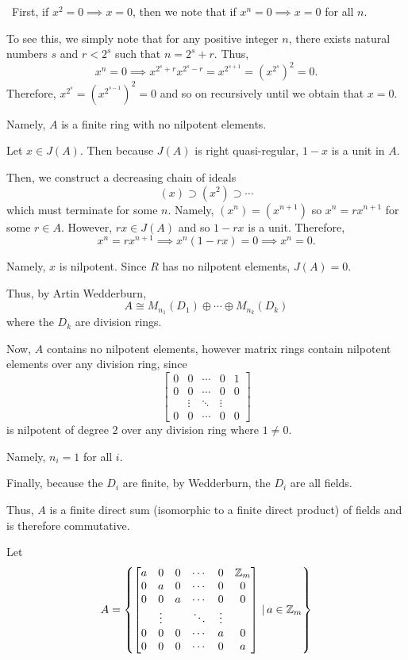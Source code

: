 \documentclass[12pt]{AlgebraQual}
\begin{document}
\begin{solution}$\,$
First, if $x^2=0\implies x=0$, then we note that if $x^n=0\implies x=0$ for all $n.$

To see this, we simply note that for any positive integer $n$, there exists natural numbers $s$ and $r<2^s$ such that $n=2^s+r$. Thus, $$x^n=0\implies x^{2^s+r}x^{2^s-r}=x^{2^{s+1}}=(x^{2^s})^2=0.$$ Therefore, $x^{2^s}=(x^{2^{s-1}})^2=0$ and so on recursively until we obtain that $x=0.$

Namely, $A$ is a finite ring with no nilpotent elements.

Let $x\in J(A)$. Then because $J(A)$ is right quasi-regular, $1-x$ is a unit in $A$.

Then, we construct a decreasing chain of ideals $$(x)\supset (x^2)\supset\cdots$$ which must terminate for some $n$. Namely, $(x^n)=(x^{n+1})$ so $x^n=rx^{n+1}$ for some $r\in A$. However, $rx\in J(A)$ and so $1-rx$ is a unit. Therefore, $$x^n=rx^{n+1}\implies x^n(1-rx)=0\implies x^n=0.$$

Namely, $x$ is nilpotent. Since $R$ has no nilpotent elements, $J(A)=0.$

Thus, by Artin Wedderburn, $$A\cong M_{n_1}(D_1)\oplus\cdots\oplus M_{n_k}(D_k)$$ where the $D_k$ are division rings.

Now, $A$ contains no nilpotent elements, however matrix rings contain nilpotent elements over any division ring, since $$\begin{bmatrix}
0 & 0 &\cdots & 0 & 1\\
0 & 0 &\cdots & 0 & 0\\
& \vdots &\ddots & \vdots &\\
0 & 0 &\cdots & 0 & 0
\end{bmatrix}$$ is nilpotent of degree $2$ over any division ring where $1\not=0$.

Namely, $n_i=1$ for all $i$.

Finally, because the $D_i$ are finite, by Wedderburn, the $D_i$ are all fields.

Thus, $A$ is a finite direct sum (isomorphic to a finite direct product) of fields and is therefore commutative.

Let $$A=\left\{\begin{bmatrix}
a & 0 & 0 & \cdots & 0 & \mathbb{Z}_m \\
0 & a  & 0 &\cdots & 0 & 0\\
0 & 0 & a  &\cdots & 0 & 0\\
& \vdots & &\ddots & \vdots & \\
0 & 0 & 0 & \cdots & a  & 0\\
0 & 0 & 0 &\cdots & 0 & a
\end{bmatrix}\,\Huge|\,a\in \mathbb{Z}_m \right\}$$


\end{solution}
\end{document}
